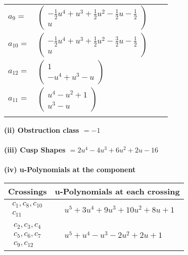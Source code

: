 \documentclass[1p]{elsarticle_modified}
\theoremstyle{definition}
\begin{document}
\begin{tabular}{m{7pt} m{180pt} m{7pt} m{180pt} }
\flushright $a_{9}=$&$\begin{pmatrix}-\frac{1}{2} u^4+u^3+\frac{1}{2} u^2-\frac{1}{2} u-\frac{1}{2}\\u\end{pmatrix}$ \\
\flushright $a_{10}=$&$\begin{pmatrix}-\frac{1}{2} u^4+u^3+\frac{1}{2} u^2-\frac{3}{2} u-\frac{1}{2}\\u\end{pmatrix}$ \\
\flushright $a_{12}=$&$\begin{pmatrix}1\\- u^4+u^3- u\end{pmatrix}$ \\
\flushright $a_{11}=$&$\begin{pmatrix}u^4- u^2+1\\u^3- u\end{pmatrix}$\\&\end{tabular}
\flushleft \textbf{(ii) Obstruction class $= -1$}\\~\\
\flushleft \textbf{(iii) Cusp Shapes $= 2 u^4-4 u^3+6 u^2+2 u-16$}\\~\\
\newpage\renewcommand{\arraystretch}{1}
\flushleft \textbf{(iv) u-Polynomials at the component}\newline \\
\begin{tabular}{m{50pt}|m{274pt}}
Crossings & \hspace{64pt}u-Polynomials at each crossing \\
\hline $$\begin{aligned}c_{1},c_{8},c_{10}\\c_{11}\end{aligned}$$&$\begin{aligned}
&u^5+3 u^4+9 u^3+10 u^2+8 u+1
\end{aligned}$\\
\hline $$\begin{aligned}c_{2},c_{3},c_{4}\\c_{5},c_{6},c_{7}\\c_{9},c_{12}\end{aligned}$$&$\begin{aligned}
&u^5+u^4- u^3-2 u^2+2 u+1
\end{aligned}$\\
\hline
\end{tabular}\\~\\
\end{document}
